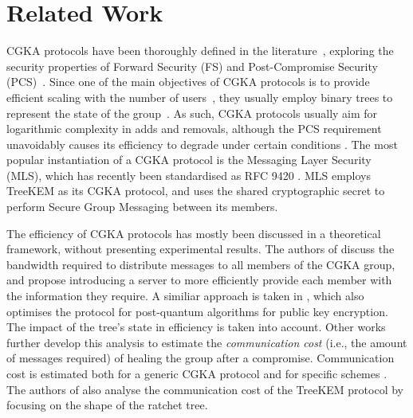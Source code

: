 \section{Related Work}
\label{sec:literature}

CGKA protocols have been thoroughly defined in the literature~\cite{cgka_analysis, itk, pass_continuous_2020}, exploring the security properties of Forward Security (FS) and Post-Compromise Security (PCS)~\cite{cgka_analysis}. Since one of the main objectives of CGKA protocols is to provide efficient  scaling with the number of users~\cite{bounds}, they usually employ binary trees to represent the state of the group~\cite{art, treekem, ttkem}. As such, CGKA protocols usually aim for logarithmic complexity in adds and removals, although the PCS requirement unavoidably causes its efficiency to degrade under certain conditions \cite{worst-case}. The most popular instantiation of a CGKA protocol is the Messaging Layer Security (MLS), which has recently been standardised as RFC 9420 \cite{mls}. MLS employs TreeKEM \cite{treekem} as its CGKA protocol, and uses the shared cryptographic secret to perform Secure Group Messaging between its members.  


The efficiency of CGKA protocols has mostly been discussed in a theoretical framework, without presenting experimental results. The authors of \cite{saik} discuss the bandwidth required to distribute messages to all members of the CGKA group, and propose introducing a server to more efficiently provide each member with the information they require. A similiar approach is taken in \cite{cmpke}, which also optimises the protocol for post-quantum algorithms for public key encryption. The impact of the tree's state in efficiency is taken into account. Other works further develop this analysis to estimate the \textit{communication cost} (i.e., the amount of messages required) of healing the group after a compromise. Communication cost is estimated both for a generic CGKA protocol \cite{cost_1, cost_2, bounds} and for specific schemes \cite{cocoa, qtk, cgka_fa}. The authors of \cite{cost_tree} also analyse the communication cost of the TreeKEM protocol by focusing on the shape of the ratchet tree.

